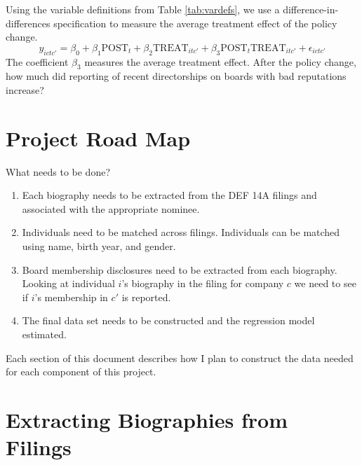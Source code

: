 \documentclass{article}
\newcommand{\1}{\mathds{1}}
\begin{document}
Using the variable definitions from Table \ref{tab:vardefs}, we use a
difference-in-differences specification to measure the average
treatment effect of the policy change.
\[
y_{ictc'} = \beta_0 + \beta_1 \text{POST}_{t} + \beta_2
\text{TREAT}_{itc'} + \beta_3 \text{POST}_{t}
\text{TREAT}_{itc'} + \epsilon_{ictc'}
\]
The coefficient $\beta_3$ measures the average treatment effect. After the
policy change, how much did reporting of recent directorships on
boards with bad reputations increase?

\section*{Project Road Map}

What needs to be done?
\begin{enumerate}
\item Each biography needs to be extracted from the DEF 14A filings and
  associated with the appropriate nominee.
\item Individuals need to be matched across filings. Individuals can
  be matched using name, birth year, and gender.
\item Board membership disclosures need to be extracted from each
  biography. Looking at individual $i$'s biography in the filing for
  company $c$ we need to see if $i$'s membership in $c'$ is reported.
\item The final data set needs to be constructed and the regression
  model estimated.
\end{enumerate}
Each section of this document describes how I plan to
construct the data needed for each component of this project.

\renewcommand*\contentsname{Outline}
\tableofcontents

\clearpage

\section{Extracting Biographies from Filings}
\end{document}
